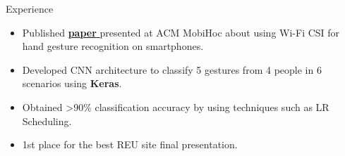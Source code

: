 \documentclass{resume} %
\begin{document}
\begin{workSection}{Experience}
\begin{itemize}
        \vspace{-0.5em}
        \itemsep -6pt {}
        \item Published
        \href{https://dl.acm.org/doi/10.1145/3565287.3617613}{\textbf{paper} \faExternalLink} 
        presented at ACM MobiHoc about using Wi-Fi CSI for hand gesture recognition on smartphones.
        \item Developed CNN architecture to classify 5 gestures from 4 people in 6 scenarios using \textbf{Keras}. %
        \item Obtained >90\% classification accuracy by using techniques such as LR Scheduling.
        \item 1st place for the best REU site final presentation. %
    \end{itemize}

\end{workSection}
\end{document}
